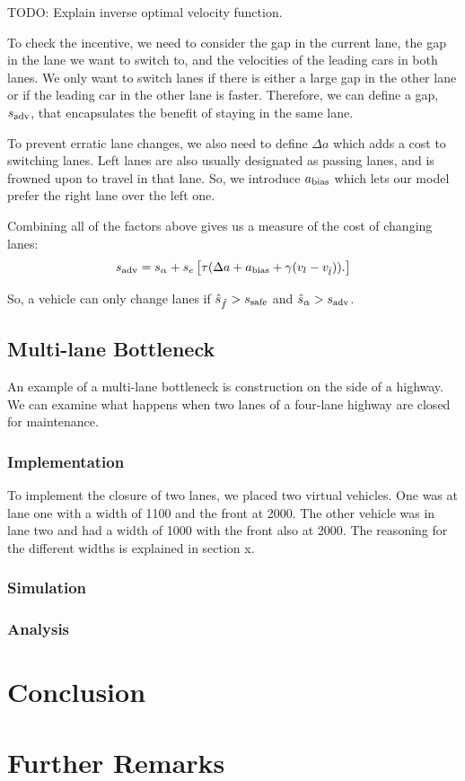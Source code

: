 \documentclass[12pt]{article}
\begin{document}
      TODO: Explain inverse optimal velocity function.

      To check the incentive, we need to consider the gap in the current lane, the gap in the lane we want to switch to, and the velocities of the leading cars in both lanes. We only want to switch lanes if there is either a large gap in the other lane or if the leading car in the other lane is faster. Therefore, we can define a gap, $s_{\rm adv}$, that encapsulates the benefit of staying in the same lane. 
      
      To prevent erratic lane changes, we also need to define $\Delta a$ which adds a cost to switching lanes.  Left lanes are also usually designated as passing lanes, and is frowned upon to travel in that lane. So, we introduce $a_{\rm bias}$ which lets our model prefer the right lane over the left one. 
      
      Combining all of the factors above gives us a measure of the cost of changing lanes:
      \begin{equation}
        s_{\rm adv} = s_{\alpha} + s_e\left[\tau(\Delta a + a_{\rm bias} + \gamma(v_l - v_{\hat l})).\right]
      \end{equation}

      So, a vehicle can only change lanes if $\hat s_{\hat f} > s_{\rm safe}$ and $\hat s_{\alpha} > s_{\rm adv}$. 


    \subsection{Multi-lane Bottleneck}
    An example of a multi-lane bottleneck is construction on the side of a highway. We can examine what happens when two lanes of a four-lane highway are closed for maintenance. 
    \subsubsection{Implementation}
    To implement the closure of two lanes, we placed two virtual vehicles. One was at lane one with a width of 1100 and the front at 2000. The other vehicle was in lane two and had a width of 1000 with the front also at 2000.  The reasoning for the different widths is explained in section x.
    \subsubsection{Simulation}
    \subsubsection{Analysis}
    \section{Conclusion}
    \section{Further Remarks}
    \printunsrtglossary[type=symbols,style=long,title={List of Symbols and Constants}]
    \newpage 
    \printbibliography
\end{document}

